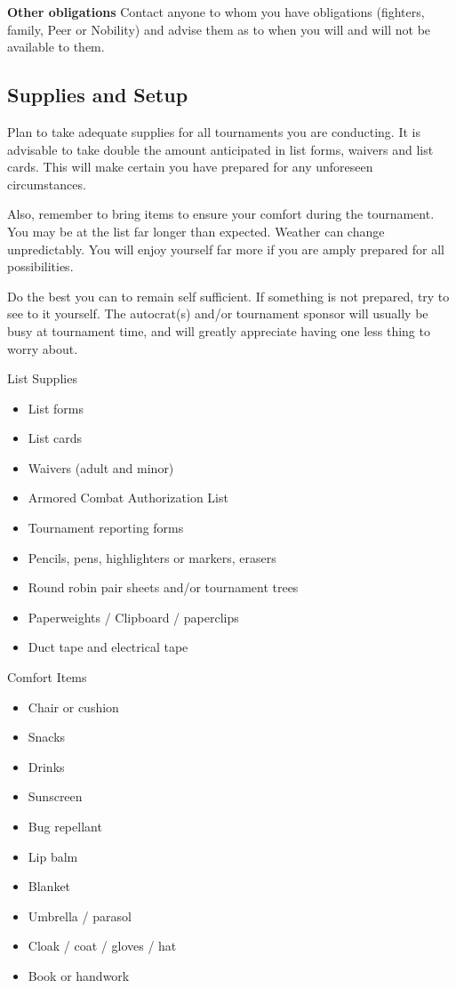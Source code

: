 \documentclass{article}
\begin{document}
\textbf{Other obligations} Contact anyone to whom you have obligations (fighters, family, Peer
or Nobility) and advise them as to when you will and will not be
available to them.

\subsection{Supplies and Setup}
Plan to take adequate supplies for all tournaments you are conducting. It is advisable to take double the
amount anticipated in list forms, waivers and list cards. This will make certain you have prepared for any
unforeseen circumstances.

Also, remember to bring items to ensure your comfort during the tournament. You may be at the list far
longer than expected. Weather can change unpredictably. You will enjoy yourself far more if you are
amply prepared for all possibilities.

Do the best you can to remain self sufficient. If something is not prepared, try to see to it yourself. The
autocrat(s) and/or tournament sponsor will usually be busy at tournament time, and will greatly appreciate
having one less thing to worry about.

List Supplies
\begin{itemize}
\item List forms
\item List cards
\item Waivers (adult and minor)
\item Armored Combat Authorization List
\item Tournament reporting forms
\item Pencils, pens, highlighters or markers, erasers
\item Round robin pair sheets and/or tournament trees
\item Paperweights / Clipboard / paperclips
\item Duct tape and electrical tape
\end{itemize}

Comfort Items
\begin{itemize}
\item Chair or cushion
\item Snacks
\item Drinks
\item Sunscreen
\item Bug repellant
\item Lip balm
\item Blanket
\item Umbrella / parasol
\item Cloak / coat / gloves / hat
\item Book or handwork
\end{itemize}
\end{document}
